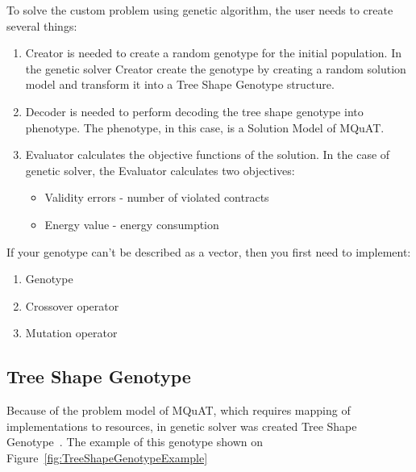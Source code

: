 To solve the custom problem using genetic algorithm, the user needs to create several things:
\begin{enumerate}
	\item Creator is needed to create a random genotype for the initial population.
	In the genetic solver Creator create the genotype by creating a random solution model and transform it into a Tree Shape Genotype structure.
	\item Decoder is needed to perform decoding the tree shape genotype into phenotype. The phenotype, in this case, is a Solution Model of MQuAT.
	\item Evaluator calculates the objective functions of the solution. In the case of genetic solver, the Evaluator calculates two objectives: 
	\begin{itemize}
		\item Validity errors - number of violated contracts
		\item Energy value - energy consumption
	\end{itemize}
\end{enumerate}

If your genotype can't be described as a vector, then you first need to implement:
\begin{enumerate}
	\item Genotype
	\item Crossover operator
	\item Mutation operator
\end{enumerate}

\subsection{Tree Shape Genotype}
Because of the problem model of MQuAT, which requires mapping of implementations to resources, in genetic solver was created Tree Shape Genotype~\cite{ahmad18}.
The example of this genotype shown on Figure~\ref{fig:TreeShapeGenotypeExample}

